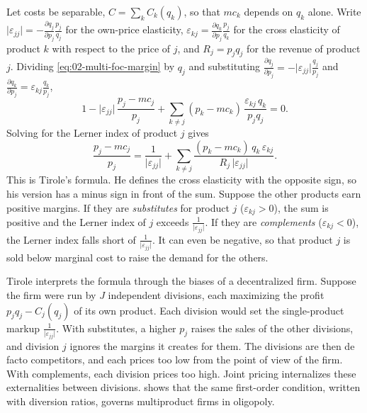  Let costs be separable, $C = \sum_k C_k(q_k)$, so that $mc_k$ depends on
$q_k$ alone. Write $\lvert\varepsilon_{jj}\rvert = -\frac{\partial q_j}{\partial p_j}\frac{p_j}{q_j}$ for the own-price
elasticity, $\varepsilon_{kj} = \frac{\partial q_k}{\partial p_j}\frac{p_j}{q_k}$ for the cross elasticity of
product $k$ with respect to the price of $j$, and $R_j = p_jq_j$ for the revenue of product $j$. Dividing
\eqref{eq:02-multi-foc-margin} by $q_j$ and substituting $\frac{\partial q_j}{\partial p_j} = -\lvert\varepsilon_{jj}
\rvert\frac{q_j}{p_j}$ and $\frac{\partial q_k}{\partial p_j} = \varepsilon_{kj}\frac{q_k}{p_j}$,
\[
  1 - \lvert\varepsilon_{jj}\rvert\,\frac{p_j - mc_j}{p_j} + \sum_{k \ne j}(p_k - mc_k)\,\frac{\varepsilon_{kj}\,q_k}
  {p_jq_j} = 0 .
\]
Solving for the Lerner index of product $j$ gives
\begin{equation}\label{eq:02-multi-lerner}
  \frac{p_j - mc_j}{p_j} = \frac{1}{\lvert\varepsilon_{jj}\rvert}
  + \sum_{k \ne j}\frac{(p_k - mc_k)\,q_k\,\varepsilon_{kj}}{R_j\,\lvert\varepsilon_{jj}\rvert} .
\end{equation}
This is Tirole's formula. He defines the cross elasticity with the opposite sign, so his version has a minus sign in
front of the sum. Suppose the other products earn positive margins. If they are \emph{substitutes} for product $j$
($\varepsilon_{kj} > 0$), the sum is positive and the Lerner index of $j$ exceeds $\frac{1}{\lvert\varepsilon_{jj}
\rvert}$. If they are \emph{complements} ($\varepsilon_{kj} < 0$), the Lerner index falls short of
$\frac{1}{\lvert\varepsilon_{jj}\rvert}$. It can even be negative, so that product $j$ is sold below marginal cost to
raise the demand for the others.

Tirole interprets the formula through the biases of a decentralized firm. Suppose the firm were run by $J$
independent divisions, each maximizing the profit $p_jq_j - C_j(q_j)$ of its own product. Each division would set
the single-product markup $\frac{1}{\lvert\varepsilon_{jj}\rvert}$. With substitutes, a higher $p_j$ raises the sales
of the other divisions, and division $j$ ignores the margins it creates for them. The divisions are then de facto
competitors, and each prices too low from the point of view of the firm. With complements, each division prices too
high. Joint pricing internalizes these externalities between divisions.  shows that the same
first-order condition, written with diversion ratios, governs multiproduct firms in oligopoly.

